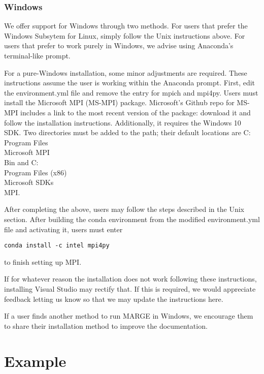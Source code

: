 \documentclass[letterpaper, 12pt]{article}
\begin{document}
\subsubsection{Windows}

\noindent We offer support for Windows through two methods.  For users that 
prefer the Windows Subsytem for Linux, simply follow the Unix instructions 
above.  For users that prefer to work purely in Windows, we advise using 
Anaconda's terminal-like prompt.\newline

\noindent For a pure-Windows installation, some minor adjustments are required.
These instructions assume the user is working within the Anaconda prompt.  
First, edit the environment.yml file and remove the entry for mpich and mpi4py. 
Users must install the Microsoft MPI (MS-MPI) package.  Microsoft's Github repo 
for MS-MPI includes a link to the most recent version of the package: download 
it and follow the installation instructions.  Additionally, it requires the 
Windows 10 SDK.  Two directories must be added to the path; their default 
locations are C:\\Program Files\\Microsoft MPI\\Bin and 
C:\\Program Files (x86)\\Microsoft SDKs\\MPI. \newline

After completing the above, users may follow the steps described in the Unix 
section.  After building the conda environment from the modified environment.yml
file and activating it, users must enter
\begin{verbatim}
conda install -c intel mpi4py
\end{verbatim}
\noindent to finish setting up MPI.\newline

\noindent If for whatever reason the installation does not work following these 
instructions, installing Visual Studio may rectify that.  If this is required, 
we would appreciate feedback letting us know so that we may update the 
instructions here. \newline

\noindent If a user finds another method to run MARGE 
in Windows, we encourage them to share their installation method to improve the 
documentation.


\section{Example}
\label{sec:example}
\end{document}
